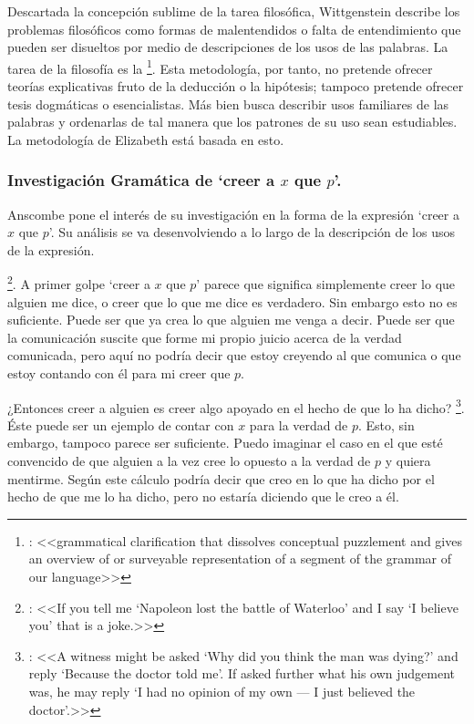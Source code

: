 Descartada la concepción sublime de la tarea filosófica, Wittgenstein describe
los problemas filosóficos como formas de malentendidos o falta de entendimiento
que pueden ser disueltos por medio de descripciones de los usos de las palabras.
La tarea de la filosofía es la \footnote{\cite[12]{bakerhacker2009understanding}: <<grammatical
  clarification that dissolves conceptual puzzlement and gives an overview of or
  surveyable representation of a segment of the grammar of our language>>}. Esta
metodología, por tanto, no pretende ofrecer teorías explicativas fruto de la
deducción o la hipótesis; tampoco pretende ofrecer tesis dogmáticas o
esencialistas. Más bien busca describir usos familiares de las palabras y
ordenarlas de tal manera que los patrones de su uso sean
estudiables\autocite[Cf.~][12]{bakerhacker2009understanding}. La metodología de
Elizabeth está basada en esto.

\subsubsection{Investigación Gramática de `creer a $x$ que $p$'.}
Anscombe pone el interés de su investigación en la forma de la expresión `creer
a $x$ que $p$'\autocite[Cf.~][2]{anscombe2008faith:tobelieve}. Su análisis se va
desenvolviendo a lo largo de la descripción de los usos de la expresión.

\footnote{\cite[4]{anscombe2008faith:tobelieve}: <<If you tell me
  `Napoleon lost the battle of Waterloo' and I say `I believe you' that is a
  joke.>>}. A primer golpe `creer a $x$ que $p$' parece que significa
simplemente creer lo que alguien me dice, o creer que lo que me dice es
verdadero. Sin embargo esto no es suficiente. Puede ser que ya crea lo que
alguien me venga a decir. Puede ser que la comunicación suscite que forme mi
propio juicio acerca de la verdad comunicada, pero aquí no podría decir que
estoy creyendo al que comunica o que estoy contando con él para mi creer que
$p$.

¿Entonces creer a alguien es creer algo apoyado en el hecho de que lo ha dicho?
\footnote{\cite[4]{anscombe2008faith:tobelieve}: <<A witness might be
  asked `Why did you think the man was dying?' and reply `Because the doctor
  told me'. If asked further what his own judgement was, he may reply `I had no
  opinion of my own --- I just believed the doctor'.>>}. Éste puede ser un
ejemplo de contar con $x$ para la verdad de $p$. Esto, sin embargo, tampoco
parece ser suficiente. Puedo imaginar el caso en el que esté convencido de que
alguien a la vez cree lo opuesto a la verdad de $p$ y quiera mentirme. Según
este cálculo podría decir que creo en lo que ha dicho por el hecho de que me lo
ha dicho, pero no estaría diciendo que le creo a él.

